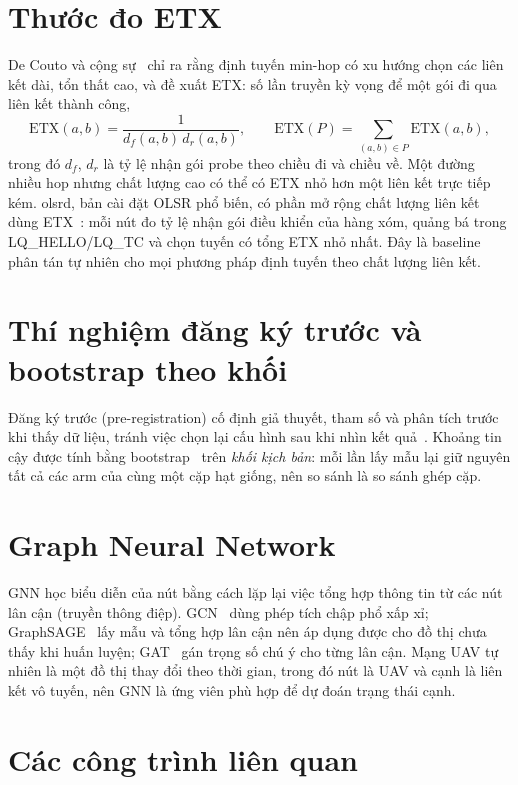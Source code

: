 \documentclass[12pt,a4paper]{report}
\begin{document}
\section{Thước đo ETX}
De Couto và cộng sự~\cite{decouto} chỉ ra rằng định tuyến min-hop có xu hướng chọn các liên kết dài, tổn thất cao, và đề xuất ETX: số lần truyền kỳ vọng để một gói đi qua liên kết thành công,
\begin{equation}
\mathrm{ETX}(a,b)=\frac{1}{d_f(a,b)\, d_r(a,b)},\qquad \mathrm{ETX}(P)=\sum_{(a,b)\in P}\mathrm{ETX}(a,b),
\end{equation}
trong đó $d_f$, $d_r$ là tỷ lệ nhận gói probe theo chiều đi và chiều về. Một đường nhiều hop nhưng chất lượng cao có thể có ETX nhỏ hơn một liên kết trực tiếp kém. olsrd, bản cài đặt OLSR phổ biến, có phần mở rộng chất lượng liên kết dùng ETX~\cite{olsrd}: mỗi nút đo tỷ lệ nhận gói điều khiển của hàng xóm, quảng bá trong LQ\_HELLO/LQ\_TC và chọn tuyến có tổng ETX nhỏ nhất. Đây là baseline phân tán tự nhiên cho mọi phương pháp định tuyến theo chất lượng liên kết.

\section{Thí nghiệm đăng ký trước và bootstrap theo khối}
Đăng ký trước (pre-registration) cố định giả thuyết, tham số và phân tích trước khi thấy dữ liệu, tránh việc chọn lại cấu hình sau khi nhìn kết quả~\cite{nosek}. Khoảng tin cậy được tính bằng bootstrap~\cite{efron} trên \emph{khối kịch bản}: mỗi lần lấy mẫu lại giữ nguyên tất cả các arm của cùng một cặp hạt giống, nên so sánh là so sánh ghép cặp.

\section{Graph Neural Network}
GNN học biểu diễn của nút bằng cách lặp lại việc tổng hợp thông tin từ các nút lân cận (truyền thông điệp). GCN~\cite{kipf} dùng phép tích chập phổ xấp xỉ; GraphSAGE~\cite{graphsage} lấy mẫu và tổng hợp lân cận nên áp dụng được cho đồ thị chưa thấy khi huấn luyện; GAT~\cite{gat} gán trọng số chú ý cho từng lân cận. Mạng UAV tự nhiên là một đồ thị thay đổi theo thời gian, trong đó nút là UAV và cạnh là liên kết vô tuyến, nên GNN là ứng viên phù hợp để dự đoán trạng thái cạnh.

\section{Các công trình liên quan}
\end{document}
